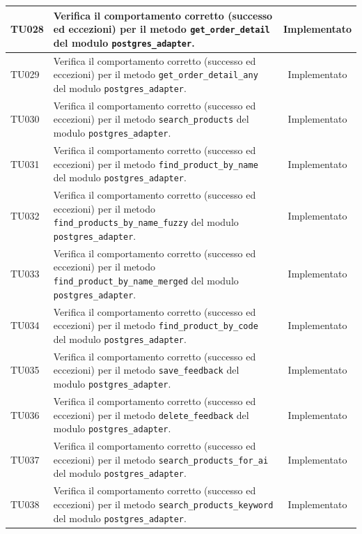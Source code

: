 \documentclass[a4paper,11pt,oneside]{scrartcl}
\begin{document}
\begin{longtable}{|p{1.9cm}|p{11.6cm}|c|}
    TU028           & Verifica il comportamento corretto (successo ed eccezioni) per il metodo \texttt{get\_order\_detail} del modulo \texttt{postgres\_adapter}.                  & Implementato   \\ \hline
    TU029           & Verifica il comportamento corretto (successo ed eccezioni) per il metodo \texttt{get\_order\_detail\_any} del modulo \texttt{postgres\_adapter}.             & Implementato   \\ \hline
    TU030           & Verifica il comportamento corretto (successo ed eccezioni) per il metodo \texttt{search\_products} del modulo \texttt{postgres\_adapter}.                    & Implementato   \\ \hline
    TU031           & Verifica il comportamento corretto (successo ed eccezioni) per il metodo \texttt{find\_product\_by\_name} del modulo \texttt{postgres\_adapter}.             & Implementato   \\ \hline
    TU032           & Verifica il comportamento corretto (successo ed eccezioni) per il metodo \texttt{find\_products\_by\_name\_fuzzy} del modulo \texttt{postgres\_adapter}.     & Implementato   \\ \hline
    TU033           & Verifica il comportamento corretto (successo ed eccezioni) per il metodo \texttt{find\_product\_by\_name\_merged} del modulo \texttt{postgres\_adapter}.     & Implementato   \\ \hline
    TU034           & Verifica il comportamento corretto (successo ed eccezioni) per il metodo \texttt{find\_product\_by\_code} del modulo \texttt{postgres\_adapter}.             & Implementato   \\ \hline
    TU035           & Verifica il comportamento corretto (successo ed eccezioni) per il metodo \texttt{save\_feedback} del modulo \texttt{postgres\_adapter}.                      & Implementato   \\ \hline
    TU036           & Verifica il comportamento corretto (successo ed eccezioni) per il metodo \texttt{delete\_feedback} del modulo \texttt{postgres\_adapter}.                    & Implementato   \\ \hline
    TU037           & Verifica il comportamento corretto (successo ed eccezioni) per il metodo \texttt{search\_products\_for\_ai} del modulo \texttt{postgres\_adapter}.           & Implementato   \\ \hline
    TU038           & Verifica il comportamento corretto (successo ed eccezioni) per il metodo \texttt{search\_products\_keyword} del modulo \texttt{postgres\_adapter}.           & Implementato   \\ \hline

\end{longtable}
\end{document}
